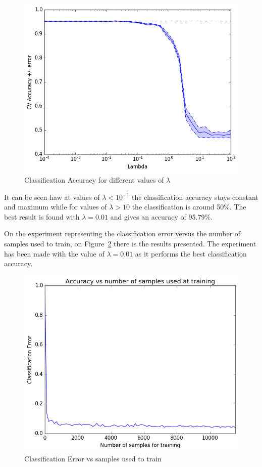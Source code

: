 \documentclass{ethz_report}
\begin{document}
\begin{figure}[H]
\centering
\includegraphics[width=.85\linewidth]{./img/cross_val_svm.png}
\caption{Classification Accuracy for different values of $\lambda$}
\label{fig:cv_lambda}
\end{figure}

It can be seen haw at values of $\lambda < 10^{-1}$ the classification accuracy stays constant and maximum while for values of $\lambda > 10$ the classification is around 50\%. The best result is found with $\lambda = 0.01$ and gives an accuracy of 95.79\%.

On the experiment representing the classification error versus the number of samples used to train, on Figure~\ref{fig:ce_vs_samples_svm} there is the results presented. The experiment has been made with the value of $\lambda = 0.01$ as it performs the best classification accuracy.

\begin{figure}[H]
\centering
\includegraphics[width=.85\linewidth]{./img/acc_vs_samples_svm.png}
\caption{Classification Error vs samples used to train }
\label{fig:ce_vs_samples_svm}
\end{figure}
\end{document}
